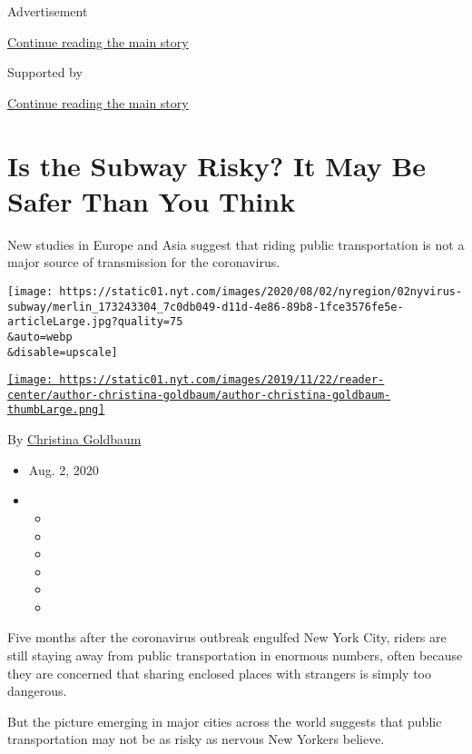 Advertisement

\protect\hyperlink{after-top}{Continue reading the main story}

Supported by

\protect\hyperlink{after-sponsor}{Continue reading the main story}

\hypertarget{is-the-subway-risky-it-may-be-safer-than-you-think}{%
\section{Is the Subway Risky? It May Be Safer Than You
Think}\label{is-the-subway-risky-it-may-be-safer-than-you-think}}

New studies in Europe and Asia suggest that riding public transportation
is not a major source of transmission for the coronavirus.

\texttt{[image: https://static01.nyt.com/images/2020/08/02/nyregion/02nyvirus-subway/merlin\_173243304\_7c0db049-d11d-4e86-89b8-1fce3576fe5e-articleLarge.jpg?quality=75\\\&auto=webp\\\&disable=upscale]}

\href{https://www.nytimes.com/by/christina-goldbaum}{\texttt{[image: https://static01.nyt.com/images/2019/11/22/reader-center/author-christina-goldbaum/author-christina-goldbaum-thumbLarge.png]}}

By \href{https://www.nytimes.com/by/christina-goldbaum}{Christina
Goldbaum}

\begin{itemize}
\item
  Aug. 2, 2020
\item
  \begin{itemize}
  \item
  \item
  \item
  \item
  \item
  \item
  \end{itemize}
\end{itemize}

Five months after the coronavirus outbreak engulfed New York City,
riders are still staying away from public transportation in enormous
numbers, often because they are concerned that sharing enclosed places
with strangers is simply too dangerous.

But the picture emerging in major cities across the world suggests that
public transportation may not be as risky as nervous New Yorkers
believe.

